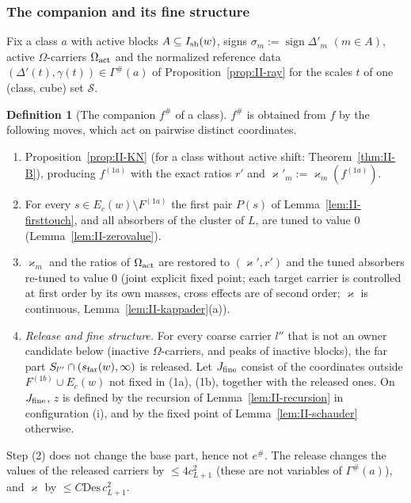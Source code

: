 \documentclass[10pt]{amsart}
\theoremstyle{definition}
\newtheorem{definition}[theorem]{Definition}
\theoremstyle{remark}
\newcommand{\sgn}{\operatorname{sign}}
\begin{document}
\subsubsection*{The companion and its fine structure}

Fix a class $a$ with active blocks $A\subseteq I_{\rm sh}(w)$, signs $\sigma_m:=\sgn
\Delta'_m$ $(m\in A)$, active $\Omega$-carriers $\Omega_{\rm act}$ and the normalized
reference data $(\Delta'(t),\gamma(t))\in\Gamma^\#(a)$ of
Proposition~\ref{prop:II-ray} for the scales $t$ of one (class, cube) set $\mathcal S$.

\begin{definition}[The companion $f^\#$ of a class]\label{def:II-compclass}
$f^\#$ is obtained from $f$ by the following moves, which act on pairwise
distinct coordinates.
\begin{enumerate}
\item[(1a)] Proposition~\ref{prop:II-KN} (for a class without active shift:
Theorem~\ref{thm:II-B}), producing $f^{(1a)}$ with the exact ratios $r'$ and
$\varkappa'_m:=\varkappa_m(f^{(1a)})$.
\item[(1b)] For every $s\in E_c(w)\setminus F^{(1a)}$ the first pair $P(s)$ of
Lemma~\ref{lem:II-firsttouch}, and all absorbers of the cluster of $L$, are tuned
to value $0$ (Lemma~\ref{lem:II-zerovalue}).
\item[(1c)] $\varkappa_m$ and the ratios of $\Omega_{\rm act}$ are restored to $(\varkappa',r')$
and the tuned absorbers re-tuned to value $0$ (joint explicit fixed point; each
target carrier is controlled at first order by its own masses, cross effects
are of second order; $\varkappa$ is continuous, Lemma~\ref{lem:II-kappader}(a)).
\item[(2)] \emph{Release and fine structure.}  For every coarse carrier $l''$ that is
not an owner candidate below (inactive $\Omega$-carriers, and peaks of inactive
blocks), the far part $S_{l''}\cap(s_{\rm far}(w),\infty)$ is released.  Let $J_{\rm fine}$
consist of the coordinates outside $F^{(1b)}\cup E_c(w)$ not fixed in (1a), (1b),
together with the released ones.  On $J_{\rm fine}$, $z$ is defined by the
recursion of Lemma~\ref{lem:II-recursion} in configuration (i), and by the fixed
point of Lemma~\ref{lem:II-schauder} otherwise.
\end{enumerate}
Step (2) does not change the base part, hence not $e^\#$.  The release changes
the values of the released carriers by $\le4c_{L+1}^2$ (these are not variables
of $\Gamma^\#(a)$), and $\varkappa$ by $\le C\mathrm{Des}\,c_{L+1}^2$.
\end{definition}
\end{document}
